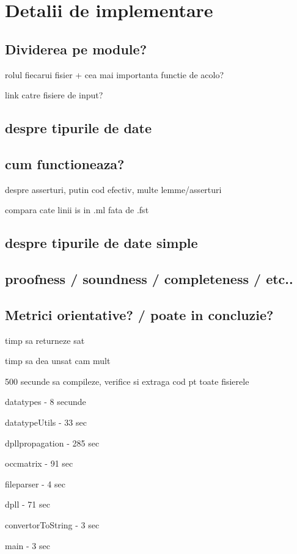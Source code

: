 \chapter{Detalii de implementare}


\section{Dividerea pe module?}

rolul fiecarui fisier + cea mai importanta functie de acolo?

link catre fisiere de input?

\section{despre tipurile de date}


\section{cum functioneaza?}

despre asserturi, putin cod efectiv, multe lemme/asserturi

compara cate linii is in .ml fata de .fst


\section{despre tipurile de date simple}


\section{proofness / soundness / completeness / etc..}


\section{Metrici orientative? / poate in concluzie?}

timp sa returneze sat

timp sa dea unsat cam mult



500 secunde sa compileze, verifice si extraga cod pt toate fisierele

datatypes - 8 secunde

datatypeUtils - 33 sec

dpllpropagation - 285 sec

occmatrix - 91 sec

fileparser - 4 sec

dpll - 71 sec

convertorToString - 3 sec

main - 3 sec

